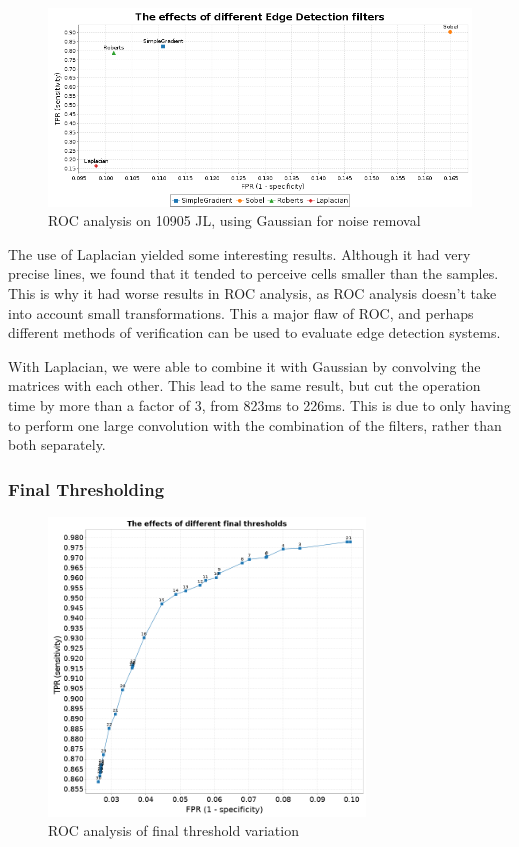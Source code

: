 \documentclass[10pt,a4paper]{article}
\begin{document}
\begin{figure}[h]
\centering
\includegraphics[scale=0.5]{graphs/1-edge_detect_all.png}
\caption{ROC analysis on 10905 JL, using Gaussian for noise removal}
\label{fig:edgedetectors}
\end{figure}

The use of Laplacian yielded some interesting results. Although it had very precise lines, we found that it tended to perceive cells smaller than the samples. This is why it had worse results in ROC analysis, as ROC analysis doesn’t take into account small transformations. This a major flaw of ROC, and perhaps different methods of verification can be used to evaluate edge detection systems.

With Laplacian, we were able to combine it with Gaussian by convolving the matrices with each other. This lead to the same result, but cut the operation time by more than a factor of 3, from 823ms to 226ms. This is due to only having to perform one large convolution with the combination of the filters, rather than both separately.
\subsubsection*{Final Thresholding}

\begin{figure}[h]
\centering
\includegraphics[width=0.75\textwidth]{graphs/threshold_example}
\caption{ROC analysis of final threshold variation}
\label{fig:finalthreshold}
\end{figure}
\end{document}
